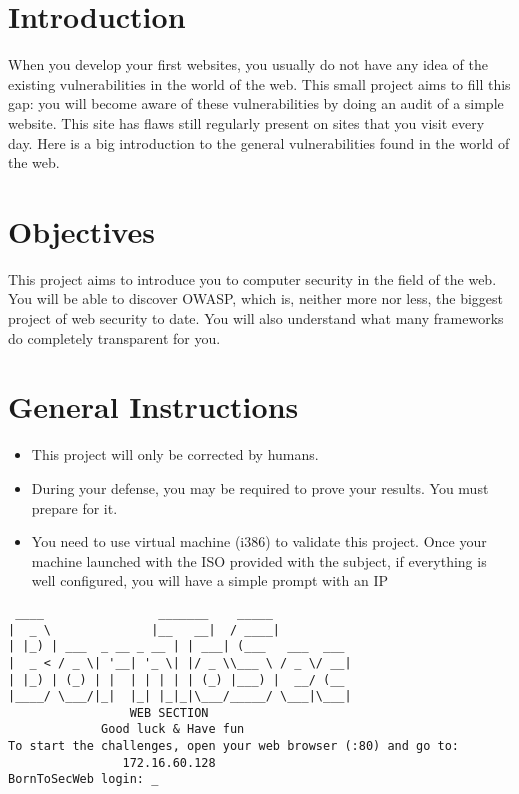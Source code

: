 \section{Introduction}

When you develop your first websites, you usually do not have any idea
of the existing vulnerabilities in the world of the web. This small
project aims to fill this gap: you will become aware of these
vulnerabilities by doing an audit of a simple website. This site has
flaws still regularly present on sites that you visit every day. Here is
a big introduction to the general vulnerabilities found in the world of
the web.

\section{Objectives}

This project aims to introduce you to computer security in the field of
the web. You will be able to discover OWASP, which is, neither more nor
less, the biggest project of web security to date. You will also
understand what many frameworks do completely transparent for you.

\section{General Instructions}

\begin{itemize}
\tightlist{}
\item
  This project will only be corrected by humans.
\item
  During your defense, you may be required to prove your results. You
  must prepare for it.
\item
  You need to use virtual machine (i386) to validate this project. Once
  your machine launched with the ISO provided with the subject, if
  everything is well configured, you will have a simple prompt with an
  IP\:
\end{itemize}

\begin{verbatim}
 ____                _______    _____
|  _ \              |__   __|  / ____|
| |_) | ___  _ __ _ __ | | ___| (___   ___  ___
|  _ < / _ \| '__| '_ \| |/ _ \\___ \ / _ \/ __|
| |_) | (_) | |  | | | | | (_) |___) |  __/ (__
|____/ \___/|_|  |_| |_|_|\___/_____/ \___|\___|
                 WEB SECTION
             Good luck & Have fun
To start the challenges, open your web browser (:80) and go to:
                172.16.60.128
BornToSecWeb login: _
\end{verbatim}

